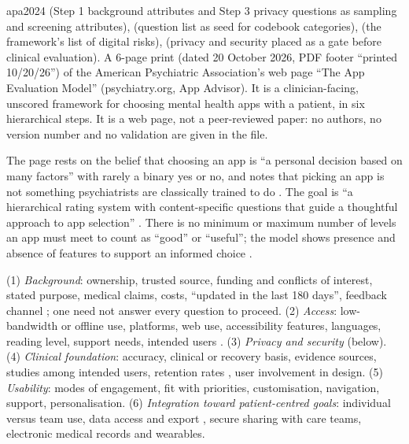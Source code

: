 \begin{papercard}{apa2024}
  (Step 1 background attributes and Step 3 privacy questions as sampling and screening attributes),  (question list as seed for codebook categories),  (the framework's list of digital risks),  (privacy and security placed as a gate before clinical evaluation). A 6-page print (dated 20 October 2026, PDF footer ``printed 10/20/26'') of the American Psychiatric Association's web page ``The App Evaluation Model'' (psychiatry.org, App Advisor). It is a clinician-facing, unscored framework for choosing mental health apps with a patient, in six hierarchical steps. It is a web page, not a peer-reviewed paper: no authors, no version number and no validation are given in the file.

 The page rests on the belief that choosing an app is ``a personal decision based on many factors'' with rarely a binary yes or no, and notes that picking an app is not something psychiatrists are classically trained to do . The goal is ``a hierarchical rating system with content-specific questions that guide a thoughtful approach to app selection'' . There is no minimum or maximum number of levels an app must meet to count as ``good'' or ``useful''; the model shows presence and absence of features to support an informed choice .

 (1) \emph{Background}: ownership, trusted source, funding and conflicts of interest, stated purpose, medical claims, costs, ``updated in the last 180 days'', feedback channel ; one need not answer every question to proceed. (2) \emph{Access}: low-bandwidth or offline use, platforms, web use, accessibility features, languages, reading level, support needs, intended users . (3) \emph{Privacy and security} (below). (4) \emph{Clinical foundation}: accuracy, clinical or recovery basis, evidence sources, studies among intended users, retention rates , user involvement in design. (5) \emph{Usability}: modes of engagement, fit with priorities, customisation, navigation, support, personalisation. (6) \emph{Integration toward patient-centred goals}: individual versus team use, data access and export , secure sharing with care teams, electronic medical records and wearables.


\end{papercard}
